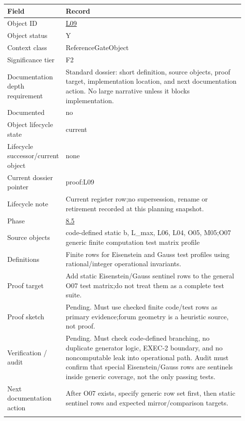 \begin{longtable}{L{0.16\linewidth} L{0.81\linewidth}}
\hline
\textbf{Field} & \textbf{Record}\\
\hline
Object ID & \hyperlink{object-row-L09}{L09}\\
\hline\addlinespace[0.20em]
Object status & Y\\
\hline\addlinespace[0.20em]
Context class & ReferenceGateObject\\
\hline\addlinespace[0.20em]
Significance tier & F2\\
\hline\addlinespace[0.20em]
Documentation depth requirement & Standard dossier: short definition, source objects, proof target, implementation location, and next documentation action. No large narrative unless it blocks implementation.\\
\hline\addlinespace[0.20em]
Documented & no\\
\hline\addlinespace[0.20em]
Object lifecycle state & current\\
\hline\addlinespace[0.20em]
Lifecycle successor/\allowbreak{}current object & none\\
\hline\addlinespace[0.20em]
Current dossier pointer & proof:L09\\
\hline\addlinespace[0.20em]
Lifecycle note & Current register row;\newline no supersession, rename or retirement recorded at this planning snapshot.\\
\hline\addlinespace[0.20em]
Phase & \hyperlink{phase-row-8-5}{8.5}\\
\hline\addlinespace[0.20em]
Source objects & code-defined static b, L\_max, L06, L04, O05, M05;\newline O07 generic finite computation test matrix profile\\
\hline\addlinespace[0.20em]
Definitions & Finite rows for Eisenstein and Gauss test profiles using rational/\allowbreak{}integer operational invariants.\\
\hline\addlinespace[0.20em]
Proof target & Add static Eisenstein/\allowbreak{}Gauss sentinel rows to the general O07 test matrix;\newline do not treat them as a complete test suite.\\
\hline\addlinespace[0.20em]
Proof sketch & Pending. Must use checked finite code/\allowbreak{}test rows as primary evidence;\newline forum geometry is a heuristic source, not proof.\\
\hline\addlinespace[0.20em]
Verification /\allowbreak{} audit & Pending. Must check code-defined branching, no duplicate generator logic, EXEC-2 boundary, and no noncomputable leak into operational path. Audit must confirm that special Eisenstein/\allowbreak{}Gauss rows are sentinels inside generic coverage, not the only passing tests.\\
\hline\addlinespace[0.20em]
Next documentation action & After O07 exists, specify generic row set first, then static sentinel rows and expected mirror/\allowbreak{}comparison targets.\\
\hline\addlinespace[0.20em]
\end{longtable}
